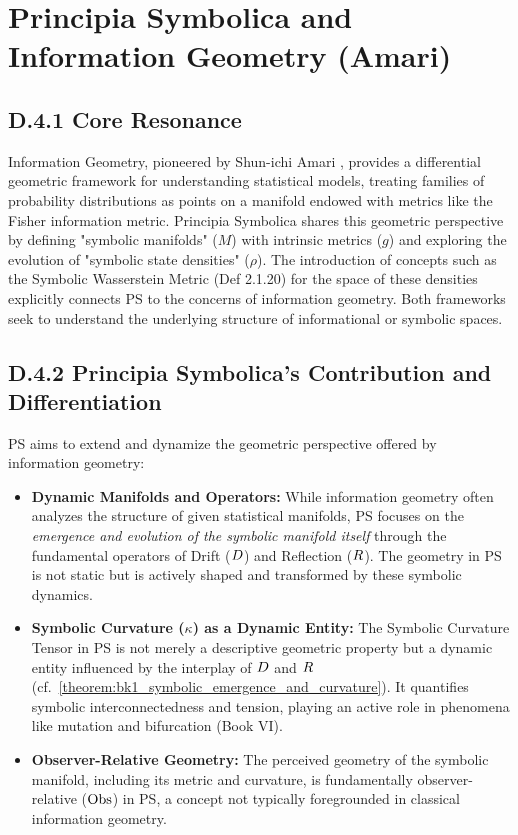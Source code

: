 \section*{Principia Symbolica and Information Geometry (Amari)} \label{sec:appD_ps_and_info_geometry_amari}
\subsection*{D.4.1 Core Resonance}
\label{subsec:appD_info_geometry_core_resonance}
Information Geometry, pioneered by Shun-ichi Amari \cite{amari2000}, provides a differential geometric framework for understanding statistical models, treating families of probability distributions as points on a manifold endowed with metrics like the Fisher information metric. Principia Symbolica shares this geometric perspective by defining "symbolic manifolds" (\(M\)) with intrinsic metrics (\(g\)) and exploring the evolution of "symbolic state densities" (\(\rho\)). The introduction of concepts such as the Symbolic Wasserstein Metric (Def 2.1.20) for the space of these densities explicitly connects PS to the concerns of information geometry. Both frameworks seek to understand the underlying structure of informational or symbolic spaces.
\subsection*{D.4.2 Principia Symbolica's Contribution and Differentiation} \label{subsec:appD_info_geometry_contribution_differentiation}
PS aims to extend and dynamize the geometric perspective offered by information geometry:
\begin{itemize}
    \item \textbf{Dynamic Manifolds and Operators:} While information geometry often analyzes the structure of given statistical manifolds, PS focuses on the \emph{emergence and evolution of the symbolic manifold itself} through the fundamental operators of Drift (\(D\)) and Reflection (\(R\)). The geometry in PS is not static but is actively shaped and transformed by these symbolic dynamics.
    \item \textbf{Symbolic Curvature (\(\kappa\)) as a Dynamic Entity:} The Symbolic Curvature Tensor in PS is not merely a descriptive geometric property but a dynamic entity influenced by the interplay of \(D\) and \(R\) (cf.~\ref{theorem:bk1_symbolic_emergence_and_curvature}). It quantifies symbolic interconnectedness and tension, playing an active role in phenomena like mutation and bifurcation (Book VI).
    \item \textbf{Observer-Relative Geometry:} The perceived geometry of the symbolic manifold, including its metric and curvature, is fundamentally observer-relative (\(\mathrm{Obs}\)) in PS, a concept not typically foregrounded in classical information geometry.
\end{itemize}
